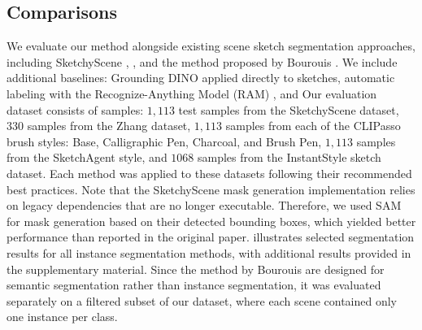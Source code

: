 \subsection{Comparisons}
We evaluate our method alongside existing scene sketch segmentation approaches, including SketchyScene \cite{Zou18SketchyScene}, , and the method proposed by Bourouis \etal {}. We include additional baselines: Grounding DINO \cite{liu2023grounding} applied directly to sketches, automatic labeling with the Recognize-Anything Model (RAM) \cite{zhang2023recognize}, and  Our evaluation dataset consists of  samples: $1,113$ test samples from the SketchyScene dataset, $330$ samples from the Zhang \etal dataset, $1,113$ samples from each of the CLIPasso brush styles: Base, Calligraphic Pen, Charcoal, and Brush Pen, $1,113$ samples from the SketchAgent style, and $1068$ samples from the InstantStyle sketch dataset.
Each method was applied to these datasets following their recommended best practices. Note that the SketchyScene mask generation implementation relies on legacy dependencies that are no longer executable. Therefore, we used SAM for mask generation based on their detected bounding boxes, which yielded better performance than reported in the original paper.  illustrates selected segmentation results for all instance segmentation methods, with additional results provided in the supplementary material. Since the method by Bourouis \etal {} are designed for semantic segmentation rather than instance segmentation, it was evaluated separately on a filtered subset of our dataset, where each scene contained only one instance per class. 

